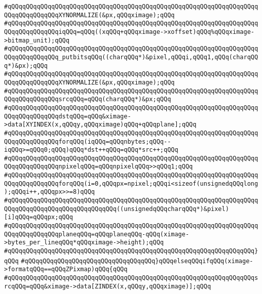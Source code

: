 \verb|#qQQqqQQqqQQqqQQqqQQqqQQqqQQqqQQqqQQqqQQqqQQqqQQqqQQqqQQqqQQqqQQqqQQqqQQqqQQqqQQqqQQqXYNORMALIZE(&px,qQQqximage);qQQq|\newline
\verb|#qQQqqQQqqQQqqQQqqQQqqQQqqQQqqQQqqQQqqQQqqQQqqQQqqQQqqQQqqQQqqQQqqQQqqQQqqQQqqQQqqQQqiqQQq=qQQq((xqQQq+qQQqximage->xoffset)qQQq%qQQqximage->bitmap_unit);qQQq|\newline
\verb|#qQQqqQQqqQQqqQQqqQQqqQQqqQQqqQQqqQQqqQQqqQQqqQQqqQQqqQQqqQQqqQQqqQQqqQQqqQQqqQQqqQQq_putbitsqQQq((charqQQq*)&pixel,qQQqi,qQQq1,qQQq(charqQQq*)&px);qQQq|\newline
\verb|#qQQqqQQqqQQqqQQqqQQqqQQqqQQqqQQqqQQqqQQqqQQqqQQqqQQqqQQqqQQqqQQqqQQqqQQqqQQqqQQqqQQqXYNORMALIZE(&px,qQQqximage);qQQq|\newline
\verb|#qQQqqQQqqQQqqQQqqQQqqQQqqQQqqQQqqQQqqQQqqQQqqQQqqQQqqQQqqQQqqQQqqQQqqQQqqQQqqQQqqQQqsrcqQQq=qQQq(charqQQq*)&px;qQQq|\newline
\verb|#qQQqqQQqqQQqqQQqqQQqqQQqqQQqqQQqqQQqqQQqqQQqqQQqqQQqqQQqqQQqqQQqqQQqqQQqqQQqqQQqqQQqdstqQQq=qQQq&ximage->data[XYINDEX(x,qQQqy,qQQqximage)qQQq+qQQqplane];qQQq|\newline
\verb|#qQQqqQQqqQQqqQQqqQQqqQQqqQQqqQQqqQQqqQQqqQQqqQQqqQQqqQQqqQQqqQQqqQQqqQQqqQQqqQQqqQQqforqQQq(iqQQq=qQQqnbytes;qQQq--iqQQq>=qQQq0;qQQq)qQQq*dst++qQQq=qQQq*src++;qQQq|\newline
\verb|#qQQqqQQqqQQqqQQqqQQqqQQqqQQqqQQqqQQqqQQqqQQqqQQqqQQqqQQqqQQqqQQqqQQqqQQqqQQqqQQqqQQqnpixelqQQq=qQQqnpixelqQQq>>qQQq1;qQQq|\newline
\verb|#qQQqqQQqqQQqqQQqqQQqqQQqqQQqqQQqqQQqqQQqqQQqqQQqqQQqqQQqqQQqqQQqqQQqqQQqqQQqqQQqqQQqforqQQq(i=0,qQQqpx=npixel;qQQqi<sizeof(unsignedqQQqlong);qQQqi++,qQQqpx>>=8)qQQq|\newline
\verb|#qQQqqQQqqQQqqQQqqQQqqQQqqQQqqQQqqQQqqQQqqQQqqQQqqQQqqQQqqQQqqQQqqQQqqQQqqQQqqQQqqQQqqQQqqQQqqQQqqQQq((unsignedqQQqcharqQQq*)&pixel)[i]qQQq=qQQqpx;qQQq|\newline
\verb|#qQQqqQQqqQQqqQQqqQQqqQQqqQQqqQQqqQQqqQQqqQQqqQQqqQQqqQQqqQQqqQQqqQQqqQQqqQQqqQQqqQQqplaneqQQq=qQQqplaneqQQq-qQQq(ximage->bytes_per_lineqQQq*qQQqximage->height);qQQq|\newline
\verb|#qQQqqQQqqQQqqQQqqQQqqQQqqQQqqQQqqQQqqQQqqQQqqQQqqQQqqQQqqQQqqQQqqQQq}qQQq|\newline
\verb|#qQQqqQQqqQQqqQQqqQQqqQQqqQQqqQQqqQQq}qQQqelseqQQqifqQQq(ximage->formatqQQq==qQQqZPixmap)qQQq{qQQq|\newline
\verb|#qQQqqQQqqQQqqQQqqQQqqQQqqQQqqQQqqQQqqQQqqQQqqQQqqQQqqQQqqQQqqQQqqQQqsrcqQQq=qQQq&ximage->data[ZINDEX(x,qQQqy,qQQqximage)];qQQq|\newline
